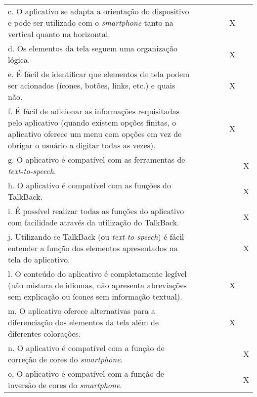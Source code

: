\documentclass[portuguese,oneside]{tcc}
\begin{document}
\begin{center}
\begin{longtabu}{|L{25em}|c|c|c|c|c|c|}
			c. O aplicativo se adapta a orientação do dispositivo e pode ser utilizado com o \emph{smartphone} tanto na vertical quanto na horizontal. & & & & & X & \\ 
			d. Os elementos da tela seguem uma organização lógica. & & & & & X & \\ 
			e. É fácil de identificar que elementos da tela podem ser acionados (ícones, botões, links, etc.) e quais não. & & & & & X & \\ 
			f. É fácil de adicionar as informações requisitadas pelo aplicativo (quando existem opções finitas, o aplicativo oferece um menu com opções em vez de obrigar o usuário a digitar todas as vezes). & & & & & X & \\ 
			g. O aplicativo é compatível com as ferramentas de \emph{text-to-speech}. & & & & & & X \\ 
			h. O aplicativo é compatível com as funções do TalkBack. & & & & & & X \\ 
			i. É possível realizar todas as funções do aplicativo com facilidade através da utilização do TalkBack.	& & & & & & X \\ 
			j. Utilizando-se TalkBack (ou \emph{text-to-speech}) é fácil entender a função dos elementos apresentados na tela do aplicativo. & & & & & & X \\ 
			l. O conteúdo do aplicativo é completamente legível (não mistura de idiomas, não apresenta abreviações sem explicação ou ícones sem informação textual). & & & & & X & \\ 
			m. O aplicativo oferece alternativas para a diferenciação dos elementos da tela além de diferentes colorações. & & & & & X & \\ 
			n. O aplicativo é compatível com a função de correção de cores do \emph{smartphone}. & & & & & & X \\ 
			o. O aplicativo é compatível com a função de inversão de cores do \emph{smartphone}. & & & & & & X \\ 
		\end{longtabu}
	\end{center}
	
\end{document}
